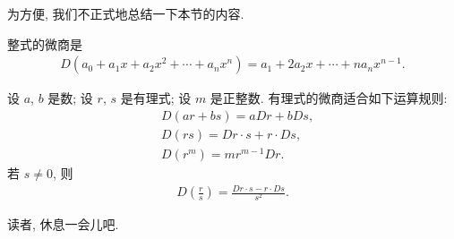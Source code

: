 为方便, 我们不正式地总结一下本节的内容.
\begin{proposition}
    整式的微商是
    \begin{align*}
        D(a_0 + a_1 x + a_2 x^2 + \cdots + a_n x^n) = a_1 + 2a_2 x + \cdots + na_n x^{n-1}.
    \end{align*}

    设 $a$, $b$ 是数; 设 $r$, $s$ 是有理式; 设 $m$ 是正整数. 有理式的微商适合如下运算规则:
    \begin{align*}
         & D(ar + bs) = aDr + bDs,          \\
         & D(rs) = Dr \cdot s + r \cdot Ds, \\
         & D(r^m) = mr^{m-1} Dr.
    \end{align*}
    若 $s \neq 0$, 则
    \begin{align*}
        D \left( \frac{r}{s} \right) = \frac{Dr \cdot s - r \cdot Ds}{s^2}.
    \end{align*}
\end{proposition}

读者, 休息一会儿吧.
